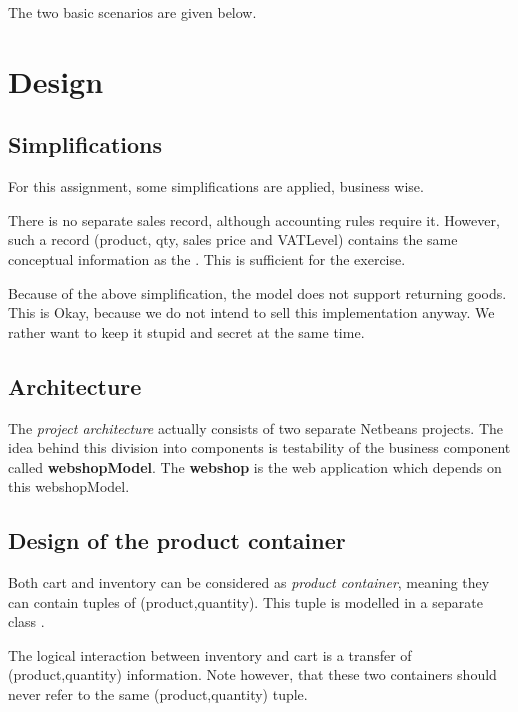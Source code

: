 The two basic scenarios are given below.
{\small

}

{\small
{}
}

\section{Design}
\subsection{Simplifications}
For this assignment, some simplifications are applied, business wise.
\begin{itemize*}
\item There is no separate sales record, although accounting rules
  require it. However, such a  record (product, qty, sales
  price and VATLevel) contains the same conceptual information as the
  . This is sufficient for the exercise.
\item Because of the above simplification, the model does not support
  returning goods. This is Okay, because we do not intend to sell this
  implementation anyway. We rather want to keep it stupid and secret
  at the same time.
\end{itemize*}

\subsection{Architecture}
The \textit{project architecture} actually consists of two separate Netbeans projects. 
The idea behind this division into components is testability of
the business component called \textbf{webshopModel}.
The \textbf{webshop} is the web application which depends on this webshopModel. 

\subsection{Design of the product container}
Both cart and inventory can be considered as \textit{product container},
meaning they can contain tuples of (product,quantity). 
This tuple is modelled in a separate class .

The logical interaction between inventory and cart is a transfer of
(product,quantity) information. Note however, that these two containers
should never refer to the same (product,quantity) tuple.

